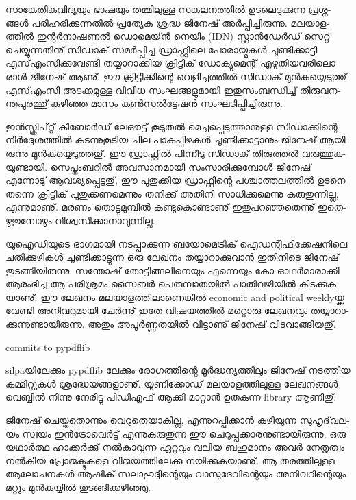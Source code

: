 ­സാ­ങ്കേ­തി­ക­വി­ദ്യ­യും ഭാ­ഷ­യും തമ്മി­ലു­ള്ള സങ്ക­ല­ന­ത്തില്‍ ഉട­ലെ­ടു­ക്കു­ന്ന പ്ര­ശ്ന­ങ്ങള്‍ പരി­ഹ­രി­ക്കു­ന്ന­തില്‍ പ്ര­ത്യേക ശ്ര­ദ്ധ ജി­നേ­ഷ് 
അര്‍­പ്പി­ച്ചി­രു­ന്നു. മല­യാ­ള­ത്തില്‍ ഇന്റര്‍­നാ­ഷ­ണല്‍ ഡൊ­മെ­യ്ന്‍ നെ­യിം (IDN) സ്റ്റാന്‍­ഡേര്‍­ഡ് സെ­റ്റ് ചെ­യ്യു­ന്ന­തി­നു് സി­ഡാ­ക്‍ 
സമര്‍­പ്പി­ച്ച ഡ്രാ­ഫ്റ്റി­ലെ പോ­രാ­യ്മ­കള്‍ ചൂ­ണ്ടി­ക്കാ­ട്ടി എസ്എം­സി­ക്കു­വേ­ണ്ടി തയ്യാ­റാ­ക്കിയ ക്രി­ട്ടി­ക്‍ ഡോ­ക്യു­മെ­ന്റ് 
എഴു­തി­യ­വ­രി­ലൊ­രാള്‍ ജി­നേ­ഷ് ആണു്. ഈ ക്രി­ട്ടി­ക്കി­ന്റെ വെ­ളി­ച്ച­ത്തില്‍ സി­ഡാ­ക്‍ മുന്‍­ക­യ്യെ­ടു­ത്തു് എസ്എം­സി അട­ക്ക­മു­ള്ള 
വി­വിധ സം­ഘ­ങ്ങ­ളു­മാ­യി ഇതു­സം­ബ­ന്ധി­ച്ച് തി­രു­വ­ന­ന്ത­പു­ര­ത്തു് കഴി­ഞ്ഞ മാ­സം കണ്‍­സല്‍­ട്ടേ­ഷന്‍ സം­ഘ­ടി­പ്പി­ച്ചി­രു­ന്നു­.

ഇന്‍­സ്ക്രി­പ്റ്റ് കീ­ബോര്‍­ഡ് ലേ­ഔ­ട്ട് കൂ­ടു­തല്‍ മെ­ച്ച­പ്പെ­ടു­ത്താ­നു­ള്ള സി­ഡാ­ക്കി­ന്റെ നിര്‍­ദ്ദേ­ശ­ത്തില്‍ കട­ന്നു­കൂ­ടിയ ചില പാ­ക­പ്പി­ഴ­കള്‍ 
ചൂ­ണ്ടി­ക്കാ­ട്ടാ­നും ജി­നേ­ഷ് ആയി­രു­ന്നു മുന്‍­ക­യ്യെ­ടു­ത്ത­തു്. ഈ ഡ്രാ­ഫ്റ്റില്‍ പി­ന്നീ­ടു സി­ഡാ­ക്‍ തി­രു­ത്തല്‍ വരു­ത്തു­ക­യു­ണ്ടാ­യി. 
സെ­പ്തം­ബ­റില്‍ അവ­സാ­ന­മാ­യി സം­സാ­രി­ക്കു­മ്പോള്‍ ജി­നേ­ഷ് എന്നോ­ടു് ആവ­ശ്യ­പ്പെ­ട്ട­തു്, ഈ പു­തു­ക്കിയ ഡ്രാ­ഫ്റ്റി­ന്റെ 
പശ്ചാ­ത്ത­ല­ത്തില്‍ ഉട­നെ തന്നെ ക്രി­ട്ടി­ക്‍ പു­തു­ക്ക­ണ­മെ­ന്നും തനി­ക്കു് അതി­നി സാ­ധി­ക്കു­മെ­ന്നു കരു­തു­ന്നി­ല്ല, എന്നു­മാ­ണു്. ­മ­ര­ണം­ 
തൊ­ട്ടു­മു­മ്പില്‍ കണ്ടു­കൊ­ണ്ടാ­ണു് ഇതു­പ­റ­ഞ്ഞ­തെ­ന്നു് ഇതെ­ഴു­തു­മ്പോ­ഴും വി­ശ്വ­സി­ക്കാ­നാ­വു­ന്നി­ല്ല.

­യു­ഐ­ഡി­യു­ടെ ഭാ­ഗ­മാ­യി നട­പ്പാ­ക്കു­ന്ന ബയോ­മെ­ട്രി­ക്‍ ഐഡ­ന്റി­ഫി­ക്കേ­ഷ­നി­ലെ ചതി­ക്കു­ഴി­കള്‍ ചൂ­ണ്ടി­ക്കാ­ട്ടു­ന്ന ഒരു ലേ­ഖ­നം 
തയ്യാ­റാ­ക്കു­വാന്‍ ഇതി­നി­ടെ ജി­നേ­ഷ് തു­ട­ങ്ങി­യി­രു­ന്നു. സന്തോ­ഷ് തോ­ട്ടി­ങ്ങ­ലി­നെ­യും എന്നെ­യും കോ-ഓഥര്‍­മാ­രാ­ക്കി ആരം­ഭി­ച്ച 
ആ പരി­ശ്ര­മം സൈ­ബര്‍ പെ­രു­മ്പാ­ത­യില്‍ പാ­തി­വ­ഴി­യില്‍ കി­ട­ക്കു­ക­യാ­ണു്. ഈ ലേ­ഖ­നം മല­യാ­ള­ത്തി­ലാ­ണെ­ങ്കില്‍ 
economic and political weekly­യ്ക്കു വേ­ണ്ടി അനി­വ­റു­മാ­യി ചേര്‍­ന്നു് ഇതേ വി­ഷ­യ­ത്തില്‍ മറ്റൊ­രു ലേ­ഖ­ന­വും 
തയ്യാ­റാ­ക്കു­ന്നു­ണ്ടാ­യി­രു­ന്നു. അതും അപൂര്‍­ണ്ണ­ത­യില്‍ വി­ട്ടാ­ണു് ജി­നേ­ഷ് വി­ട­വാ­ങ്ങി­യ­തു്.

commits to pypdflib

silpa­യി­ലേ­ക്കും pypdflib ലേ­ക്കും രോ­ഗ­ത്തി­ന്റെ മൂര്‍­ദ്ധ­ന്യ­ത്തി­ലും ജി­നേ­ഷ് നട­ത്തിയ കമ്മിറ്റുകള്‍ ശ്ര­ദ്ധേ­യ­ങ്ങ­ളാ­ണു്. യൂ­ണി­ക്കോ­ഡ് 
മല­യാ­ള­ത്തി­ലു­ള്ള ലേ­ഖ­ന­ങ്ങള്‍ വെ­ബ്ബില്‍ നി­ന്നു നേ­രി­ട്ടു ­പി­ഡി­എ­ഫ് ആക്കി മാ­റ്റാന്‍ ഉത­കു­ന്ന library ആണി­തു്.

­ജി­നേ­ഷ് ചെ­യ്ത­തൊ­ന്നും വെ­റു­തെ­യാ­കി­ല്ല, എന്നു­റ­പ്പി­ക്കാന്‍ കഴി­യു­ന്ന സു­ഹൃ­ദ്‌­വ­ല­യം സ്വ­യം ഇന്‍­ട്രോ­വെര്‍­ട്ട് എന്നു­കു­രു­തു­ന്ന 
ഈ ചെ­റു­പ്പ­ക്കാ­ര­നു­ണ്ടാ­യി­രു­ന്നു. ഒരു യഥാര്‍­ത്ഥ ഹാ­ക്കര്‍­ക്കു് നല്‍­കാ­വു­ന്ന ഏറ്റ­വും വലിയ ബഹു­മാ­നം അവര്‍ നേ­തൃ­ത്വം 
നല്‍­കിയ പ്രോ­ജ­ക്ടു­ക­ളെ വി­ജ­യ­ത്തി­ലേ­ക്കു നയി­ക്കു­ക­യാ­ണു്. ആ തര­ത്തി­ലു­ള്ള ആലോ­ച­ന­കള്‍ ആഷി­ക്‍ സലാ­ഹു­ദ്ദീ­ന്റെ­യും 
വാ­സു­ദേ­വി­ന്റെ­യും അനി­വ­റി­ന്റെ­യും മറ്റും മുന്‍­ക­യ്യില്‍ തു­ട­ങ്ങി­ക്ക­ഴി­ഞ്ഞു­.

